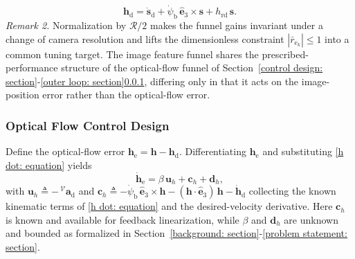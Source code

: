 \documentclass{IEEEtaes}
\begin{document}
\begin{equation} \label{h_d final: equation}
    \boldsymbol{h}_\text{d} = \dot{\boldsymbol{s}}_\text{d} + \dot{\psi}_\text{b}\,\hat{\boldsymbol{e}}_3\times\boldsymbol{s} + h_\text{rd}\,\boldsymbol{s}.
\end{equation}
\textit{Remark 2.} Normalization by $\mathcal{R}/2$ makes the funnel gains invariant under a change of camera resolution and lifts the dimensionless constraint $|\bar{r}_{\text{e}_k}|\le 1$ into a common tuning target. The image feature funnel shares the prescribed-performance structure of the optical-flow funnel of Section~\ref{control design: section}-\ref{outer loop: section}\ref{optic flow control: section}, differing only in that it acts on the image-position error rather than the optical-flow error.

\subsubsection{Optical Flow Control Design} \label{optic flow control: section}
Define the optical-flow error $\boldsymbol{h}_\text{e}=\boldsymbol{h}-\boldsymbol{h}_\text{d}$. Differentiating $\boldsymbol{h}_\text{e}$ and substituting \eqref{h dot: equation} yields
\begin{equation} \label{h_e_dot_1: equation}
    \dot{\boldsymbol{h}}_\text{e} = \beta\,\boldsymbol{u}_h + \boldsymbol{c}_h + \boldsymbol{d}_h,
\end{equation}
with $\boldsymbol{u}_h \triangleq -\,^\mathcal{V}\boldsymbol{a}_\text{d}$ and $\boldsymbol{c}_h \triangleq -\dot{\psi}_\text{b}\,\hat{\boldsymbol{e}}_3\times\boldsymbol{h} - (\boldsymbol{h}\cdot\hat{\boldsymbol{e}}_3)\,\boldsymbol{h} - \dot{\boldsymbol{h}}_\text{d}$ collecting the known kinematic terms of \eqref{h dot: equation} and the desired-velocity derivative. Here $\boldsymbol{c}_h$ is known and available for feedback linearization, while $\beta$ and $\boldsymbol{d}_h$ are unknown and bounded as formalized in Section~\ref{background: section}-\ref{problem statement: section}.
\end{document}
